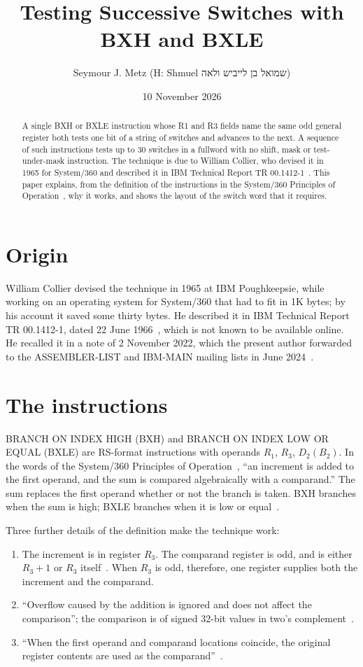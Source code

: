 \documentclass[11pt]{article}
\title{Testing Successive Switches with BXH and BXLE}
\author{Seymour J. Metz (H: Shmuel \texthebrew{שמואל בן לייביש ולאה})}
\date{10 November 2026}
\begin{document}
\maketitle

\begin{abstract}
A single BXH or BXLE instruction whose R1 and R3 fields name the same odd
general register both tests one bit of a string of switches and advances to
the next. A sequence of such instructions tests up to 30 switches in a
fullword with no shift, mask or test-under-mask instruction. The technique
is due to William Collier, who devised it in 1965 for System/360 and
described it in IBM Technical Report TR 00.1412-1~\cite{collier1966}. This
paper explains, from the definition of the instructions in the System/360
Principles of Operation~\cite{poo360}, why it works, and shows the layout of
the switch word that it requires.
\end{abstract}

\section{Origin}

William Collier devised the technique in 1965 at IBM Poughkeepsie, while
working on an operating system for System/360 that had to fit in 1K bytes;
by his account it saved some thirty bytes. He described it in IBM Technical
Report TR 00.1412-1, dated 22 June 1966~\cite{collier1966}, which is not
known to be available online. He recalled it in a note of 2 November 2022,
which the present author forwarded to the ASSEMBLER-LIST and IBM-MAIN
mailing lists in June 2024~\cite{metz2024,ibmmain2024}.

\section{The instructions}

BRANCH ON INDEX HIGH (BXH) and BRANCH ON INDEX LOW OR EQUAL (BXLE) are
RS-format instructions with operands $R_1$, $R_3$, $D_2(B_2)$. In the words
of the System/360 Principles of Operation~\cite[p.~66]{poo360}, ``an
increment is added to the first operand, and the sum is compared
algebraically with a comparand.'' The sum replaces the first operand whether
or not the branch is taken. BXH branches when the sum is high; BXLE branches
when it is low or equal~\cite[p.~66.1]{poo360}.

Three further details of the definition make the technique work:
\begin{enumerate}
\item The increment is in register $R_3$. The comparand register is odd, and
  is either $R_3 + 1$ or $R_3$ itself~\cite[p.~66.1]{poo360}. When $R_3$ is
  odd, therefore, one register supplies both the increment and the
  comparand.
\item ``Overflow caused by the addition is ignored and does not affect the
  comparison''; the comparison is of signed 32-bit values in two's
  complement~\cite[p.~66]{poo360}.
\item ``When the first operand and comparand locations coincide, the
  original register contents are used as the comparand''~\cite[p.~66]{poo360}.
\end{enumerate}
\end{document}
